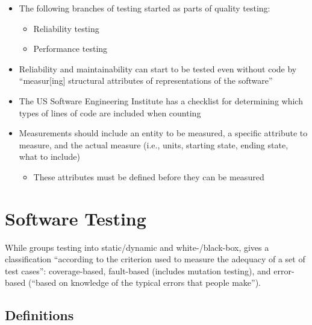 \begin{itemize}
      \item The following branches of testing started as parts of quality
            testing:
            \begin{itemize}
                  \item Reliability testing \cite[p.~18, ch.~10]{fenton_software_1997}
                  \item Performance testing \cite[p.~18, ch.~7]{fenton_software_1997}
            \end{itemize}
      \item Reliability and maintainability can start to be tested even without
            code by ``measur[ing] structural attributes of representations of the
            software'' \cite[p.~18]{fenton_software_1997}
      \item The US Software Engineering Institute has a checklist for determining
            which types of lines of code are included when counting
            \cite[pp.~30-31]{fenton_software_1997}
      \item Measurements should include an entity to be measured, a specific
            attribute to measure, and the actual measure (i.e., units, starting
            state, ending state, what to include) \cite[p.~36]{fenton_software_1997}
            \begin{itemize}
                  \item These attributes must be defined before they can be
                        measured \cite[p.~38]{fenton_software_1997}
            \end{itemize}
\end{itemize}

\section{Software Testing}
\label{chap:notes:sec:software-testing}

While \cite{patton_software_2006} groups testing into static/dynamic and
white-/black-box, \cite[p.~398-399]{van_vliet_software_2000} gives a
classification ``according to the criterion used to measure the adequacy of a
set of test cases'': coverage-based, fault-based (includes mutation testing),
and error-based (``based on knowledge of the typical errors that people make'').

\subsection{Definitions}

